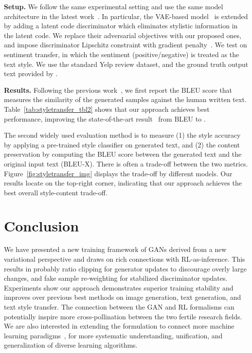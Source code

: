 \documentclass{article}
\newcommand{\0}{\bm{0}}
\begin{document}
\textbf{Setup.} We follow the same experimental setting and use the same model architecture in the latest work~\cite{tikhonov2019style}. In particular, the VAE-based model~\cite{hu2017toward,kingma2013auto} is extended by adding a latent code discriminator which eliminates stylistic information in the latent code. We replace their adversarial objectives with our proposed ones, and impose discriminator Lipschitz constraint with gradient penalty~\cite{wgangp}. 
We test on sentiment transfer, in which the sentiment (positive/negative) is treated as the text style. We use the standard Yelp review dataset,
and the ground truth output text provided by \cite{li2018delete}.


\textbf{Results.} Following the previous work~\cite{tikhonov2019style}, we first report the BLEU score that measures the similarity of the generated samples against the human written text. Table~\ref{tab:styletransfer_tbl2} shows that our approach achieves best performance, improving the state-of-the-art result~\cite{tikhonov2019style} from BLEU  to .

The second widely used evaluation method is to measure (1) the style accuracy by applying a pre-trained style classifier on generated text, and (2) the content preservation by computing the BLEU score between the generated text and the original input text (BLEU-X). There is often a trade-off between the two metrics. Figure~\ref{fig:styletransfer_img} displays the trade-off by different models. Our results locate on the top-right corner, indicating that our approach achieves the best overall style-content trade-off.


























\section{Conclusion}\label{sec:conclusion}
We have presented a new training framework of GANs derived from a new variational perspective and draws on rich connections with RL-as-inference. This results in probably ratio clipping for generator updates to discourage overly large changes, and fake sample re-weighting for stabilized discriminator updates. Experiments show our approach demonstrates superior training stability and improves over previous best methods on image generation, text generation, and text style transfer. 
The connection between the GAN and RL formalisms can potentially inspire more cross-pollination between the two fertile research fields. We are also interested in extending the formulation to connect more machine learning paradigms~\citep{hu2020learning}, for more systematic understanding, unification, and generalization of diverse learning algorithms.
\end{document}

